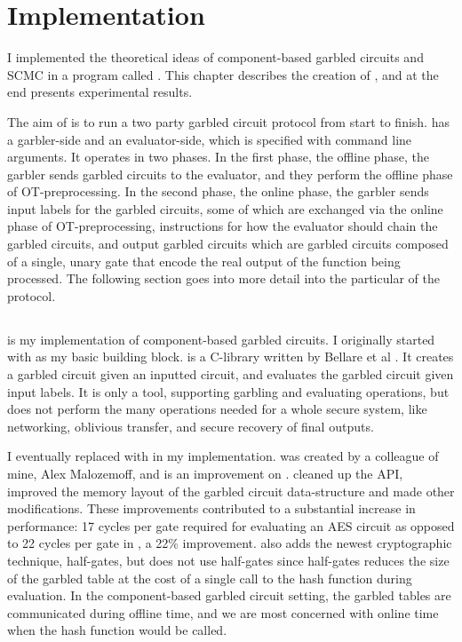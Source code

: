 
\chapter{Implementation}

I implemented the theoretical ideas of component-based garbled circuits and SCMC in a program called \CompGC. 
This chapter describes the creation of \CompGC, and at the end presents experimental results. 

The aim of \CompGC is to run a two party garbled circuit protocol from start to finish. 
\CompGC has a garbler-side and an evaluator-side, which is specified with command line arguments.
It operates in two phases.
In the first phase, the offline phase, the garbler sends garbled circuits to the evaluator, and they perform the offline phase of OT-preprocessing.
In the second phase, the online phase, the garbler sends input labels for the garbled circuits, some of which are exchanged via the online phase of OT-preprocessing, instructions for how the evaluator should chain the garbled circuits, and output garbled circuits which are garbled circuits composed of a single, unary gate that encode the real output of the function being processed.
The following section goes into more detail into the particular of the \CompGC protocol.

\section{\CompGC}
\CompGC is my implementation of component-based garbled circuits. 
I originally started with \JustGarble as my basic building block. 
\JustGarble is a C-library written by Bellare et al \cite{justgarble}. 
It creates a garbled circuit given an inputted circuit, and evaluates the garbled circuit given input labels. 
It is only a tool, supporting garbling and evaluating operations, but does not perform the many operations needed for a whole secure system, like networking, oblivious transfer, and secure recovery of final outputs. 

I eventually replaced \JustGarble with \LibGarble in my implementation.
\LibGarble was created by a colleague of mine, Alex Malozemoff, and is an improvement on \JustGarble.
\LibGarble cleaned up the API, improved the memory layout of the garbled circuit data-structure and made other modifications. 
These improvements contributed to a substantial increase in performance: 17 cycles per gate required for evaluating an AES circuit as opposed to 22 cycles per gate in \JustGarble, a 22\% improvement. 
\LibGarble also adds the newest cryptographic technique, half-gates, but \CompGC does not use half-gates since half-gates reduces the size of the garbled table at the cost of a single call to the hash function during evaluation. 
In the component-based garbled circuit setting, the garbled tables are communicated during offline time, and we are most concerned with online time when the hash function would be called. 

